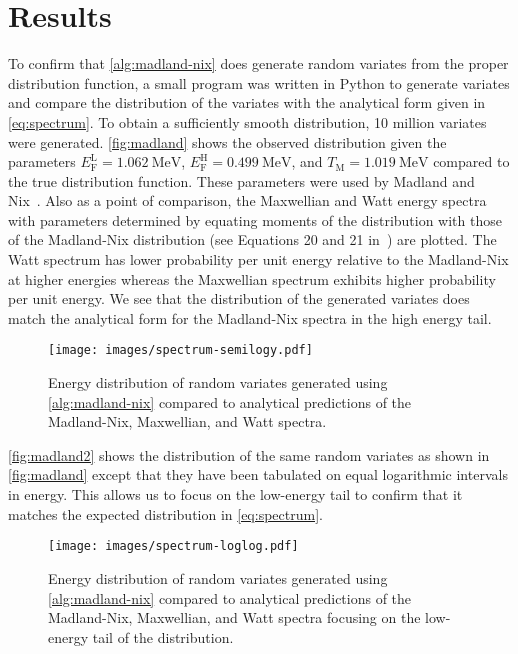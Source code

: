 \documentclass[3p,fleqn]{elsarticle}
\newcommand{\tmax}{T_{\mathrm{M}}}
\newcommand{\efl}{E_{\mathrm{F}}^{\mathrm{L}}}
\newcommand{\efh}{E_{\mathrm{F}}^{\mathrm{H}}}
\begin{document}
\section{Results}

To confirm that \autoref{alg:madland-nix} does generate random variates from the
proper distribution function, a small program was written in Python to generate
variates and compare the distribution of the variates with the analytical form
given in \autoref{eq:spectrum}. To obtain a sufficiently smooth distribution, 10
million variates were generated. \autoref{fig:madland} shows the observed
distribution given the parameters $\efl = \SI{1.062}{\mega\electronvolt}$, $\efh
= \SI{0.499}{\mega\electronvolt}$, and $\tmax = \SI{1.019}{\mega\electronvolt}$
compared to the true distribution function. These parameters were used by
Madland and Nix~\cite{nse-madland-1982}. Also as a point of comparison, the
Maxwellian and Watt energy spectra with parameters determined by equating
moments of the distribution with those of the Madland-Nix distribution (see
Equations 20 and 21 in~\cite{nse-madland-1982}) are plotted. The Watt spectrum
has lower probability per unit energy relative to the Madland-Nix at higher
energies whereas the Maxwellian spectrum exhibits higher probability per unit
energy. We see that the distribution of the generated variates does match the
analytical form for the Madland-Nix spectra in the high energy tail.
\begin{figure}[htbp]
  \centering \texttt{[image: images/spectrum-semilogy.pdf]}
  \caption{Energy distribution of random variates generated using
    \autoref{alg:madland-nix} compared to analytical predictions of the
    Madland-Nix, Maxwellian, and Watt spectra.}
  \label{fig:madland}
\end{figure}

\autoref{fig:madland2} shows the distribution of the same random variates as
shown in \autoref{fig:madland} except that they have been tabulated on equal
logarithmic intervals in energy. This allows us to focus on the low-energy tail
to confirm that it matches the expected distribution in \autoref{eq:spectrum}.
\begin{figure}[htbp]
  \centering
  \texttt{[image: images/spectrum-loglog.pdf]}
  \caption{Energy distribution of random variates generated using
    \autoref{alg:madland-nix} compared to analytical predictions of the
    Madland-Nix, Maxwellian, and Watt spectra focusing on the low-energy tail of
    the distribution.}
  \label{fig:madland2}
\end{figure}
\end{document}
